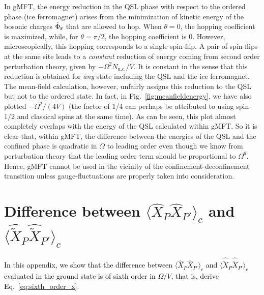 \documentclass[twocolumn,superscriptaddress,amsmath,amssymb,aps,prx,nofootinbib]{revtex4-2}
\newcommand{\newtext}[1]{\textcolor{black}{#1}}
\begin{document}
In gMFT, the energy reduction in the QSL phase with respect to the ordered phase (ice ferromagnet) arises from the minimization of kinetic energy of the bosonic charges $\hat{\Phi}_{\vb{r}}$ that are allowed to hop. When $\theta=0$, the hopping coefficient is maximized, while, for $\theta=\pi/2$, the hopping coefficient is 0. However, microscopically, this hopping corresponds to a single spin-flip. A pair of spin-flips at the same site leads to a \textit{constant} reduction of energy coming from second order perturbation theory, given by $-\Omega^2 N_{\text{u.c.}}/V$. It is constant in the sense that this reduction is obtained for \textit{any} state including the QSL and the ice ferromagnet. The mean-field calculation, however, unfairly assigns this reduction to the QSL but not to the ordered state. In fact, in Fig.~\ref{fig:meanfieldenergy}, we have also plotted $-\Omega^2/(4V)$ (the factor of 1/4 can perhaps be attributed to using spin-$1/2$ and classical spins at the same time). As can be seen, this plot almost completely overlaps with the energy of the QSL calculated within gMFT. So it is clear that, within gMFT, the difference between the energies of the QSL and the confined phase is quadratic in $\Omega$ to leading order even though we know from perturbation theory that the leading order term should be proportional to $\Omega^6$. Hence, gMFT cannot be used in the vicinity of the confinement-deconfinement transition unless gauge-fluctuations are properly taken into consideration.

\section{Difference between $\langle \hat{X}_P \hat{X}_{P'} \rangle_c $ and $ \langle \hat{\tilde{X}}_P \hat{\tilde{X}}_{P'} \rangle_c$}\label{app:corrections_plaq}

\newtext{In this appendix, we show that the difference between $\langle \hat{X}_P \hat{X}_{P'} \rangle_c $ and $ \langle \hat{\tilde{X}}_P \hat{\tilde{X}}_{P'} \rangle_c$ evaluated in the ground state is of sixth order in $\Omega/V$, that is, derive Eq.~\eqref{eq:sixth_order_x}.}
\end{document}
